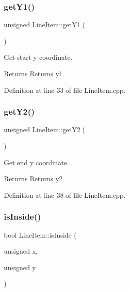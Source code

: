 \subsubsection{\texorpdfstring{get\+Y1()}{getY1()}}
{\footnotesize\ttfamily unsigned Line\+Item\+::get\+Y1 (\begin{DoxyParamCaption}{ }\end{DoxyParamCaption})}



Get start y coordinate. 

\begin{DoxyReturn}{Returns}
Returns y1 
\end{DoxyReturn}


Definition at line 33 of file Line\+Item.\+cpp.

\mbox{\label{classLineItem_aa99afab282d1e7e25b5d1549a41984d2}} 
\subsubsection{\texorpdfstring{get\+Y2()}{getY2()}}
{\footnotesize\ttfamily unsigned Line\+Item\+::get\+Y2 (\begin{DoxyParamCaption}{ }\end{DoxyParamCaption})}



Get end y coordinate. 

\begin{DoxyReturn}{Returns}
Returns y2 
\end{DoxyReturn}


Definition at line 38 of file Line\+Item.\+cpp.

\mbox{\label{classLineItem_af7dc675a032b27d6424536994095a95e}} 
\subsubsection{\texorpdfstring{is\+Inside()}{isInside()}}
{\footnotesize\ttfamily bool Line\+Item\+::is\+Inside (\begin{DoxyParamCaption}\item[{unsigned}]{x,  }\item[{unsigned}]{y }\end{DoxyParamCaption})}



